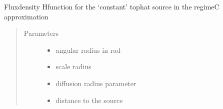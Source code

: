 \documentclass[letterpaper,10pt,english]{sphinxmanual}
\begin{document}
\begin{fulllineitems}
\label{\detokenize{diffsph.profiles:diffsph.profiles.analytics.cofdC}}
\sphinxAtStartPar
Flux\sphinxhyphen{}density H\sphinxhyphen{}function for the ‘constant’ top\sphinxhyphen{}hat source in the regime\sphinxhyphen{}C approximation
\begin{quote}\begin{description}
\item[{Parameters}] \leavevmode\begin{itemize}
\item {} 
\sphinxAtStartPar
{} \textendash{} angular radius in rad

\item {} 
\sphinxAtStartPar
{} \textendash{} scale radius

\item {} 
\sphinxAtStartPar
{} \textendash{} diffusion radius parameter

\item {} 
\sphinxAtStartPar
{} \textendash{} distance to the source

\end{itemize}

\end{description}\end{quote}

\end{fulllineitems}

\end{document}
